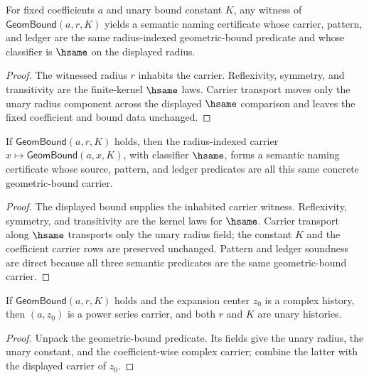 \begin{theorem}
\label{thm:geom-bound-radius-semantic-namecert}
For fixed coefficients \(a\) and unary bound constant \(K\), any witness of \(\mathsf{GeomBound}(a,r,K)\) yields a semantic naming certificate whose carrier, pattern, and ledger are the same radius-indexed geometric-bound predicate and whose classifier is \(\hsame\) on the displayed radius.
\end{theorem}
\begin{proof}
The witnessed radius \(r\) inhabits the carrier. Reflexivity, symmetry, and transitivity are the finite-kernel \(\hsame\) laws. Carrier transport moves only the unary radius component across the displayed \(\hsame\) comparison and leaves the fixed coefficient and bound data unchanged.
\end{proof}

\begin{theorem}
\label{thm:geom-bound-semantic-namecert}
If \(\mathsf{GeomBound}(a,r,K)\) holds, then the radius-indexed carrier
\(x\mapsto\mathsf{GeomBound}(a,x,K)\), with classifier \(\hsame\), forms a
semantic naming certificate whose source, pattern, and ledger predicates are
all this same concrete geometric-bound carrier.
\end{theorem}
\begin{proof}
The displayed bound supplies the inhabited carrier witness. Reflexivity,
symmetry, and transitivity are the kernel laws for \(\hsame\). Carrier
transport along \(\hsame\) transports only the unary radius field; the constant
\(K\) and the coefficient carrier rows are preserved unchanged. Pattern and
ledger soundness are direct because all three semantic predicates are the same
geometric-bound carrier.
\end{proof}

\begin{lemma}
\label{lem:geom-bound-power-series-carrier}
If \(\mathsf{GeomBound}(a,r,K)\) holds and the expansion center \(z_0\) is a
complex history, then \((a,z_0)\) is a power series carrier, and both \(r\)
and \(K\) are unary histories.
\end{lemma}
\begin{proof}
Unpack the geometric-bound predicate. Its fields give the unary radius, the
unary constant, and the coefficient-wise complex carrier; combine the latter
with the displayed carrier of \(z_0\).
\end{proof}

